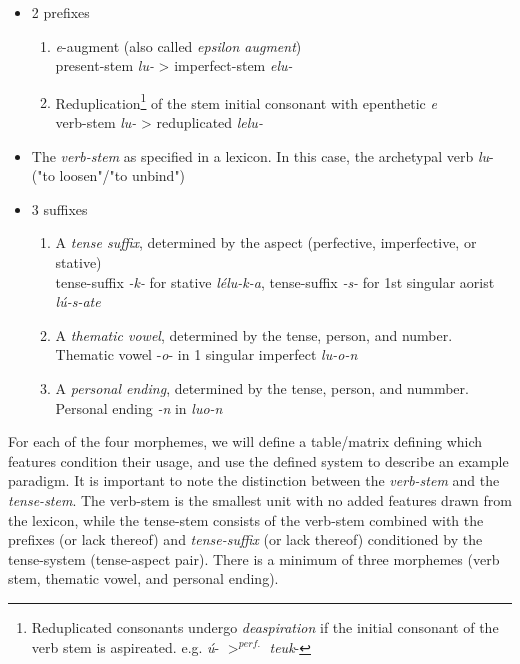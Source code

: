 \documentclass[12pt]{article}
\begin{document}
\begin{itemize}
    \item 2 prefixes
        \begin{enumerate}
            \item \textit{e}-augment (also called \textit{epsilon augment})\\
                present-stem \textit{lu-} > imperfect-stem \textit{elu-}
            \item Reduplication\footnote{Reduplicated consonants undergo
                \textit{deaspiration} if the initial consonant of the verb stem
                is aspireated. e.g. \textit{\'{u}}- $>^{perf.}$
                \textit{teuk}-} of the stem initial consonant with
                epenthetic \textit{e}\\ verb-stem \textit{lu-} > reduplicated
                \textit{lelu-}
        \end{enumerate}
    \item The \textit{verb-stem} as specified in a lexicon. In this case, the
        archetypal verb \textit{lu}- ("to loosen"/"to unbind")
    \item 3 suffixes
        \begin{enumerate}
            \item A \textit{tense suffix}, determined by the aspect
                (perfective, imperfective, or stative)\\
                tense-suffix \textit{-k-} for stative \textit{l\'{e}lu-k-a},
                tense-suffix \textit{-s-} for 1st singular aorist
                \textit{l\'{u}-s-ate}
            \item A \textit{thematic vowel}, determined by the tense, person, and number.\\
                Thematic vowel -\textit{o}- in 1 singular imperfect \textit{lu-o-n}
            \item A \textit{personal ending}, determined by the tense, person, and nummber.\\
                Personal ending \textit{-n} in \textit{luo-n}
        \end{enumerate}
\end{itemize}

For each of the four morphemes, we will define a table/matrix defining which
features condition their usage, and use the defined system to describe an
example paradigm. It is important to note the distinction between the
\textit{verb-stem} and the \textit{tense-stem}. The verb-stem is the smallest
unit with no added features drawn from the lexicon, while the tense-stem consists
of the verb-stem combined with the prefixes (or lack thereof) and \textit{tense-suffix}
(or lack thereof) conditioned by the tense-system (tense-aspect pair). There is a minimum
of three morphemes (verb stem, thematic vowel, and personal ending).
\end{document}
